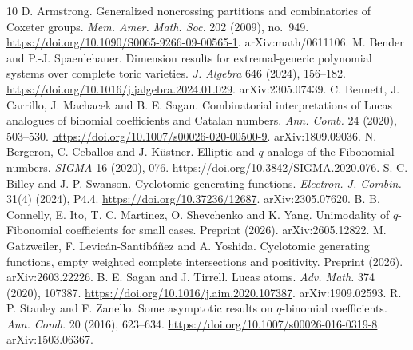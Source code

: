 \documentclass[11pt,a4paper]{article}
\theoremstyle{definition}\newtheorem{definition}[theorem]{Definition}
\theoremstyle{remark}\newtheorem{remark}[theorem]{Remark}\newtheorem{example}[theorem]{Example}
\numberwithin{equation}{section}
\begin{document}
\begin{thebibliography}{10}
 D. Armstrong. Generalized noncrossing partitions and combinatorics of Coxeter groups. \emph{Mem. Amer. Math. Soc.} 202 (2009), no.~949. \url{https://doi.org/10.1090/S0065-9266-09-00565-1}. arXiv:math/0611106.
 M. Bender and P.-J. Spaenlehauer. Dimension results for extremal-generic polynomial systems over complete toric varieties. \emph{J. Algebra} 646 (2024), 156--182. \url{https://doi.org/10.1016/j.jalgebra.2024.01.029}. arXiv:2305.07439.
 C. Bennett, J. Carrillo, J. Machacek and B. E. Sagan. Combinatorial interpretations of Lucas analogues of binomial coefficients and Catalan numbers. \emph{Ann. Comb.} 24 (2020), 503--530. \url{https://doi.org/10.1007/s00026-020-00500-9}. arXiv:1809.09036.
 N. Bergeron, C. Ceballos and J. K\"ustner. Elliptic and $q$-analogs of the Fibonomial numbers. \emph{SIGMA} 16 (2020), 076. \url{https://doi.org/10.3842/SIGMA.2020.076}.
 S. C. Billey and J. P. Swanson. Cyclotomic generating functions. \emph{Electron. J. Combin.} 31(4) (2024), P4.4. \url{https://doi.org/10.37236/12687}. arXiv:2305.07620.
 B. B. Connelly, E. Ito, T. C. Martinez, O. Shevchenko and K. Yang. Unimodality of $q$-Fibonomial coefficients for small cases. Preprint (2026). arXiv:2605.12822.
 M. Gatzweiler, F. Levic\'an-Santib\'a\~nez and A. Yoshida. Cyclotomic generating functions, empty weighted complete intersections and positivity. Preprint (2026). arXiv:2603.22226.
 B. E. Sagan and J. Tirrell. Lucas atoms. \emph{Adv. Math.} 374 (2020), 107387. \url{https://doi.org/10.1016/j.aim.2020.107387}. arXiv:1909.02593.
 R. P. Stanley and F. Zanello. Some asymptotic results on $q$-binomial coefficients. \emph{Ann. Comb.} 20 (2016), 623--634. \url{https://doi.org/10.1007/s00026-016-0319-8}. arXiv:1503.06367.
\end{thebibliography}
\end{document}
